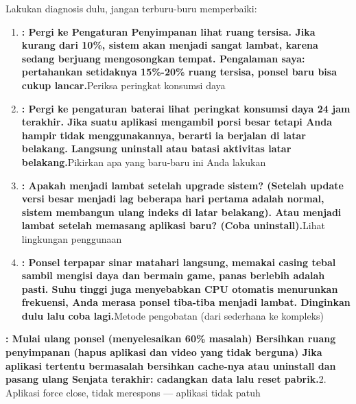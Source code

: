 


Lakukan diagnosis dulu, jangan terburu-buru memperbaiki:


\begin{enumerate}
  \item \textbf{: Pergi ke Pengaturan Penyimpanan lihat ruang tersisa. Jika kurang dari 10\%, sistem akan menjadi sangat lambat, karena sedang berjuang mengosongkan tempat. Pengalaman saya: pertahankan setidaknya 15\%-20\% ruang tersisa, ponsel baru bisa cukup lancar.}Periksa peringkat konsumsi daya
  \item \textbf{: Pergi ke pengaturan baterai lihat peringkat konsumsi daya 24 jam terakhir. Jika suatu aplikasi mengambil porsi besar tetapi Anda hampir tidak menggunakannya, berarti ia berjalan di latar belakang. Langsung uninstall atau batasi aktivitas latar belakang.}Pikirkan apa yang baru-baru ini Anda lakukan
  \item \textbf{: Apakah menjadi lambat setelah upgrade sistem? (Setelah update versi besar menjadi lag beberapa hari pertama adalah normal, sistem membangun ulang indeks di latar belakang). Atau menjadi lambat setelah memasang aplikasi baru? (Coba uninstall).}Lihat lingkungan penggunaan
  \item \textbf{: Ponsel terpapar sinar matahari langsung, memakai casing tebal sambil mengisi daya dan bermain game, panas berlebih adalah pasti. Suhu tinggi juga menyebabkan CPU otomatis menurunkan frekuensi, Anda merasa ponsel tiba-tiba menjadi lambat. Dinginkan dulu lalu coba lagi.}Metode pengobatan (dari sederhana ke kompleks)
\end{enumerate}

\textbf{: Mulai ulang ponsel (menyelesaikan 60\% masalah) Bersihkan ruang penyimpanan (hapus aplikasi dan video yang tidak berguna) Jika aplikasi tertentu bermasalah bersihkan cache-nya atau uninstall dan pasang ulang Senjata terakhir: cadangkan data lalu reset pabrik.}2. Aplikasi force close, tidak merespons — aplikasi tidak patuh

